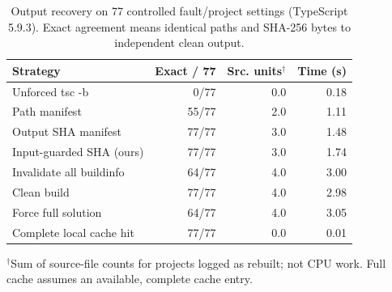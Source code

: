 \begin{table}[t]
\centering
\small
\caption{Output recovery on 77 controlled fault/project settings (TypeScript 5.9.3). Exact agreement means identical paths and SHA-256 bytes to independent clean output.}
\label{tab:n21-recovery}
\begin{tabular}{lrrr}
\toprule
Strategy & Exact / 77 & Src. units$^\dagger$ & Time (s) \\
\midrule
Unforced tsc -b & 0/77 & 0.0 & 0.18 \\
Path manifest & 55/77 & 2.0 & 1.11 \\
Output SHA manifest & 77/77 & 3.0 & 1.48 \\
Input-guarded SHA (ours) & 77/77 & 3.0 & 1.74 \\
Invalidate all buildinfo & 64/77 & 4.0 & 3.00 \\
Clean build & 77/77 & 4.0 & 2.98 \\
Force full solution & 64/77 & 4.0 & 3.05 \\
Complete local cache hit & 77/77 & 0.0 & 0.01 \\
\bottomrule
\end{tabular}
\vspace{1mm}
\footnotesize{$^\dagger$Sum of source-file counts for projects logged as rebuilt; not CPU work. Full cache assumes an available, complete cache entry.}
\end{table}
